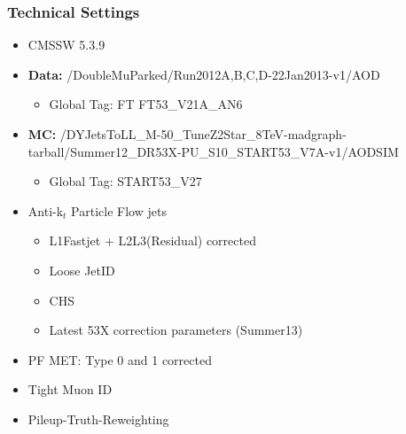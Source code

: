 \begin{frame}
  \frametitle{Technical Settings}
  
  \begin{itemize}
    \item CMSSW 5.3.9
    \item \textbf{Data:} \footnotesize{/DoubleMuParked/Run2012A,B,C,D-22Jan2013-v1/AOD}
      \begin{itemize}
       \item[] Global Tag: FT FT53\_V21A\_AN6
      \end{itemize}
    \item \textbf{MC:} \footnotesize{/DYJetsToLL\_M-50\_TuneZ2Star\_8TeV-madgraph-tarball/Summer12\_DR53X-PU\_S10\_START53\_V7A-v1/AODSIM}
      \begin{itemize}
       \item[] Global Tag: START53\_V27 \newline
      \end{itemize}
    \item Anti-k$_t$ Particle Flow jets
      \begin{itemize}
       \item L1Fastjet + L2L3(Residual) corrected
       \item Loose JetID
       \item CHS
       \item Latest 53X correction parameters (Summer13) \newline
      \end{itemize}
    \item PF MET: Type 0 and 1 corrected
    \item Tight Muon ID
    \item Pileup-Truth-Reweighting 

  \end{itemize}

\end{frame}